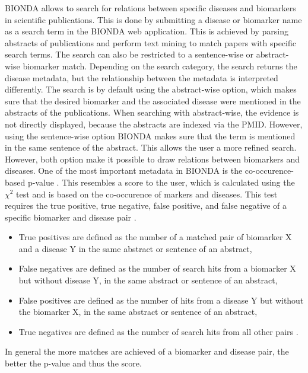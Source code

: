 \ac{BIONDA} allows to search for relations between specific diseases and biomarkers in scientific publications. This is done by submitting a disease or biomarker name as a search term in the BIONDA web application. This is achieved by parsing abstracts of publications and perform text mining to match papers with specific search terms. The search can also be restricted to a sentence-wise or abstract-wise biomarker match. Depending on the search category, the search returns the disease metadata, but the relationship between the metadata is interpreted differently. The search is by default using the abstract-wise option, which makes sure that the desired biomarker and the associated disease were mentioned in the abstracts of the publications. When searching with abstract-wise, the evidence is not directly displayed, because the abstracts are indexed via the \ac{PMID}. However, using the sentence-wise option \ac{BIONDA} makes sure that the term is mentioned in the same sentence of the abstract. This allows the user a more refined search.  However, both option make it possible to draw relations between biomarkers and diseases.  One of the most important metadata in \ac{BIONDA} is the co-occurence-based p-value \citep{pvalue}. This resembles a score to the user, which is calculated using the $\chi^2$ test \citep{chisquaredtest} and is based on the co-occurence of markers and diseases. This test requires the true positive, true negative, false positive, and false negative of a specific biomarker and disease pair \citep{bionda_web}.

\begin{itemize}
\item{True positives are defined as the number of a matched pair of biomarker X and a disease Y in the same abstract or sentence of an abstract, }
\item{False negatives are defined as the number of search hits from a biomarker X but without disease Y, in the same abstract or sentence of an abstract, }
\item{False positives are defined as the number of hits from a disease Y but without the biomarker X, in the same abstract or sentence of an abstract, }
\item{True negatives are defined as the number of search hits from all other pairs \citep{bionda_web}.}
\end{itemize}

In general the more matches are achieved of a biomarker and disease pair, the better the p-value and thus the score.\\

